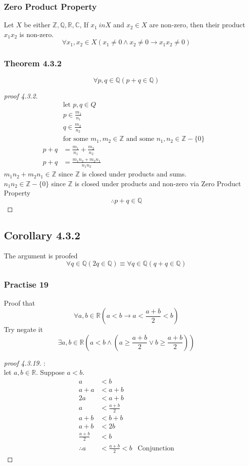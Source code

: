 \documentclass[12pt]{book}
\newcommand{\Z}{\mathbb{Z}}
\newcommand{\R}{\mathbb{R}}
\newcommand{\C}{\mathbb{C}}
\newcommand{\Q}{\mathbb{Q}}
\newcommand{\paren}[1]{\left( #1 \right)}
\begin{document}
\subsubsection{Zero Product Property}
Let $X$ be either $\Z, \Q, \R, \C$, If $x_1 \ in X$ and $x_2 \in X$ are non-zero, then their product $x_1x_2$ is non-zero. 
\[
\forall x_1, x_2 \in X 
\paren{x_1 \neq 0 \wedge x_2 \neq 0 \rightarrow x_1x_2 \neq 0}
\]

\subsubsection{Theorem 4.3.2}
\[
\forall p,q \in \Q \paren{p+q \in \Q}
\]
\begin{proof}[proof 4.3.2]
\begin{align*}
    &\text{let $p,q \in Q$}\\
    &p \in \frac{m_1}{n_1}\\
    &q \in \frac{m_2}{n_2}\\
    &\text{for some $m_1,m_2 \in \Z$ and some } \text{$n_1,n_2\in \Z - \{0\}$}&\\
    p + q &= \frac{m_1}{n_1} + \frac{m_2}{n_2}\\
    p+q & = \frac{m_1n_2 + m_2n_1}{n_1n_2}
\end{align*}
    $m_1n_2 + m_2n_1 \in \Z$ since $\Z$ is closed under products and sums.\\
    $n_1n_2 \in \Z - \{0\}$ since $\Z$ is closed under products and non-zero via Zero Product Property\\
    \[
    \therefore p+q \in \Q
    \]
\end{proof}
\subsection{Corollary 4.3.2}
The argument is proofed
\[
\forall q \in \Q \paren{2q \in \Q} \equiv
\forall q \in \Q \paren{q+q \in \Q}
\]


\newpage
\subsubsection{Practise 19}
Proof that
\[
\forall a,b\in \R \paren{a<b \rightarrow a< \frac{a+b}{2}<b}
\]
Try negate it
\[
\exists a,b\in \R \paren{a<b \wedge 
\paren{a\geq \frac{a+b}{2} \vee b \geq \frac{a+b}{2}}}
\]
\begin{proof}[proof 4.3.19]:\\

    let $a,b \in \R$. Suppose $a<b$. \\
    \begin{align*}
        a& <b\\
        a + a &< a +b\\
         2a &< a+b\\
         a &< \frac{a+b}{2}\\
         a+b &< b+b\\
         a+b &< 2b\\
         \frac{a+b}{2} &< b\\
        \therefore  a & <\frac{a+b}{2}<b & \text{Conjunction}
    \end{align*}
    
\end{proof}
\end{document}
